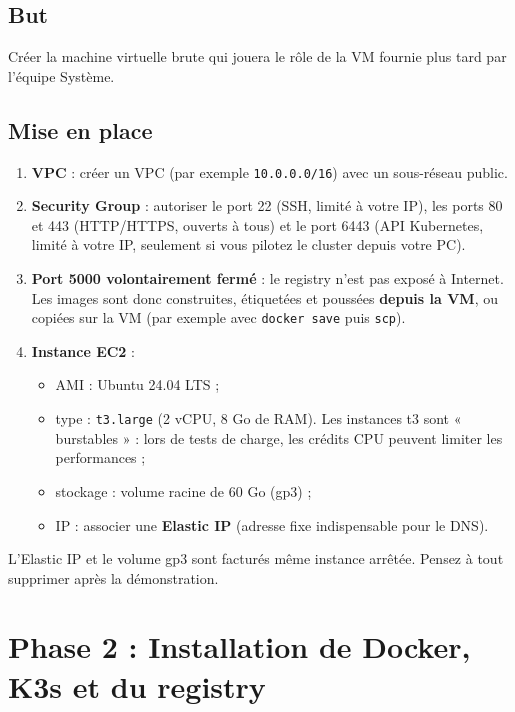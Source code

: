 \documentclass[12pt,a4paper]{article}
\begin{document}
\subsection{But}
Créer la machine virtuelle brute qui jouera le rôle de la VM fournie plus tard par l'équipe Système.

\subsection{Mise en place}
\begin{enumerate}
    \item \textbf{VPC} : créer un VPC (par exemple \nolinkurl{10.0.0.0/16}) avec un sous-réseau public.
    \item \textbf{Security Group} : autoriser le port 22 (SSH, limité à votre IP), les ports 80 et 443 (HTTP/HTTPS, ouverts à tous) et le port 6443 (API Kubernetes, limité à votre IP, seulement si vous pilotez le cluster depuis votre PC).
    \item \textbf{Port 5000 volontairement fermé} : le registry n'est pas exposé à Internet. Les images sont donc construites, étiquetées et poussées \textbf{depuis la VM}, ou copiées sur la VM (par exemple avec \texttt{docker save} puis \texttt{scp}).
    \item \textbf{Instance EC2} :
    \begin{itemize}
        \item AMI : Ubuntu 24.04 LTS ;
        \item type : \texttt{t3.large} (2 vCPU, 8 Go de RAM). Les instances t3 sont « burstables » : lors de tests de charge, les crédits CPU peuvent limiter les performances ;
        \item stockage : volume racine de 60 Go (gp3) ;
        \item IP : associer une \textbf{Elastic IP} (adresse fixe indispensable pour le DNS).
    \end{itemize}
\end{enumerate}

\begin{tcolorbox}[colback=yellow!10!white,colframe=orange!75!black,title=Coût]
L'Elastic IP et le volume gp3 sont facturés même instance arrêtée. Pensez à tout supprimer après la démonstration.
\end{tcolorbox}

\section{Phase 2 : Installation de Docker, K3s et du registry}
\end{document}
